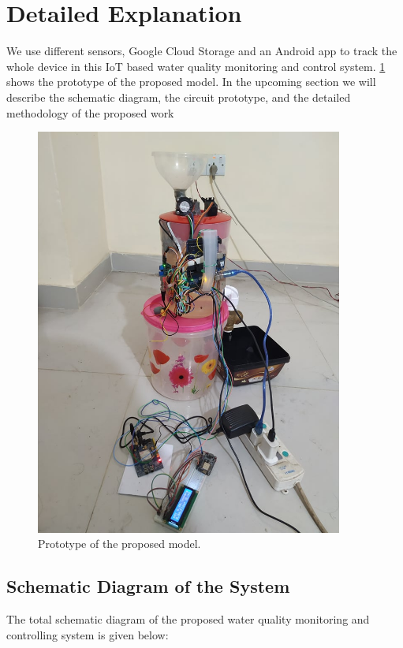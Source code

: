\section{Detailed Explanation}
We use different sensors, Google Cloud Storage and an Android app to track the whole device in this IoT based water quality monitoring and control system.
\ref{RealImage} shows the prototype of the proposed model.
In the upcoming section we will describe the schematic diagram, the circuit prototype, and the detailed methodology of the proposed work
\begin{figure}[H]
\centering
\includegraphics[width=0.9\textwidth]{figures/real_setup.jpg}
\caption{Prototype of the proposed model.}
\label{RealImage}
\end{figure}
\subsection{Schematic Diagram of the System}
The total schematic diagram of the proposed water quality monitoring and controlling system is given below:

